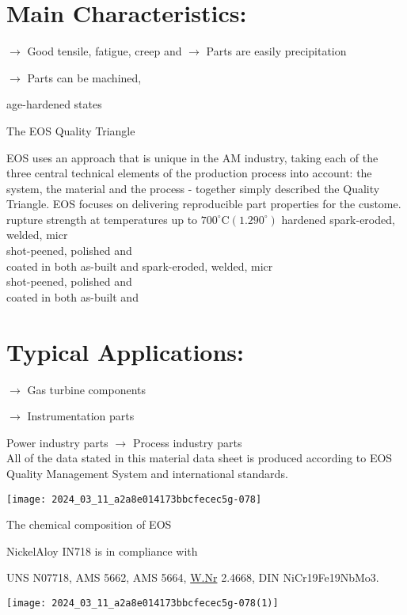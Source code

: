 \documentclass[10pt]{article}
\begin{document}
\section*{Main Characteristics:}
$\longrightarrow$ Good tensile, fatigue, creep and $\longrightarrow$ Parts are easily precipitation

$\longrightarrow$ Parts can be machined,

age-hardened states

The EOS Quality Triangle

EOS uses an approach that is unique in the AM industry, taking each of the three central technical elements of the production process into account: the system, the material and the process - together simply described the Quality Triangle. EOS focuses on delivering reproducible part properties for the custome. rupture strength at temperatures up to $700^{\circ} \mathrm{C}\left(1.290^{\circ}\right)$ hardened spark-eroded, welded, micr\\
shot-peened, polished and\\
coated in both as-built and spark-eroded, welded, micr\\
shot-peened, polished and\\
coated in both as-built and

\section*{Typical Applications:}
$\longrightarrow$ Gas turbine components

$\rightarrow$ Instrumentation parts

Power industry parts $\longrightarrow$ Process industry parts\\
All of the data stated in this material data sheet is produced according to EOS Quality Management System and international standards.

\begin{center}
\texttt{[image: 2024\_03\_11\_a2a8e014173bbcfecec5g-078]}
\end{center}

The chemical composition of EOS

NickelAloy IN718 is in compliance with

UNS N07718, AMS 5662, AMS 5664, \href{http://W.Nr}{W.Nr} 2.4668, DIN NiCr19Fe19NbMo3.

\begin{center}
\texttt{[image: 2024\_03\_11\_a2a8e014173bbcfecec5g-078(1)]}
\end{center}
\end{document}
